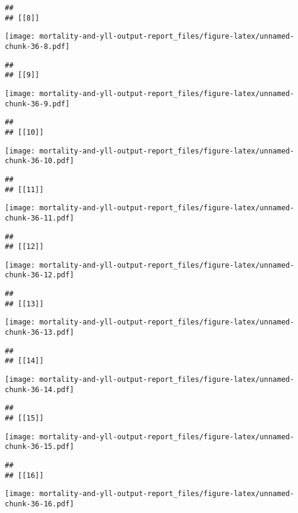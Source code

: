 \documentclass[
]{article}
\begin{document}
\begin{verbatim}
## 
## [[8]]
\end{verbatim}

\texttt{[image: mortality-and-yll-output-report\_files/figure-latex/unnamed-chunk-36-8.pdf]}

\begin{verbatim}
## 
## [[9]]
\end{verbatim}

\texttt{[image: mortality-and-yll-output-report\_files/figure-latex/unnamed-chunk-36-9.pdf]}

\begin{verbatim}
## 
## [[10]]
\end{verbatim}

\texttt{[image: mortality-and-yll-output-report\_files/figure-latex/unnamed-chunk-36-10.pdf]}

\begin{verbatim}
## 
## [[11]]
\end{verbatim}

\texttt{[image: mortality-and-yll-output-report\_files/figure-latex/unnamed-chunk-36-11.pdf]}

\begin{verbatim}
## 
## [[12]]
\end{verbatim}

\texttt{[image: mortality-and-yll-output-report\_files/figure-latex/unnamed-chunk-36-12.pdf]}

\begin{verbatim}
## 
## [[13]]
\end{verbatim}

\texttt{[image: mortality-and-yll-output-report\_files/figure-latex/unnamed-chunk-36-13.pdf]}

\begin{verbatim}
## 
## [[14]]
\end{verbatim}

\texttt{[image: mortality-and-yll-output-report\_files/figure-latex/unnamed-chunk-36-14.pdf]}

\begin{verbatim}
## 
## [[15]]
\end{verbatim}

\texttt{[image: mortality-and-yll-output-report\_files/figure-latex/unnamed-chunk-36-15.pdf]}

\begin{verbatim}
## 
## [[16]]
\end{verbatim}

\texttt{[image: mortality-and-yll-output-report\_files/figure-latex/unnamed-chunk-36-16.pdf]}
\end{document}
